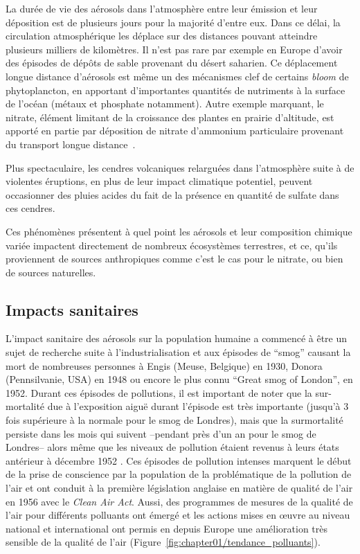 La durée de vie des aérosols dans l'atmosphère entre leur émission et leur déposition est
de plusieurs jours pour la majorité d'entre eux. Dans ce délai, la circulation atmosphérique les déplace sur des
distances pouvant atteindre plusieurs milliers de kilomètres. Il n'est pas rare par exemple en
Europe d'avoir des épisodes de dépôts de sable provenant du désert saharien. Ce
déplacement longue distance d'aérosols est même un des mécanismes clef de certains
\textit{bloom}
de phytoplancton, en apportant d'importantes quantités de nutriments à la surface de l'océan 
(métaux et phosphate notamment).
Autre exemple marquant, le nitrate, élément limitant de la croissance des
plantes en prairie d'altitude, est apporté en partie par
déposition de nitrate d'ammonium particulaire provenant du transport longue
distance~\autocite{bourgeoisFoliar2019}.

Plus spectaculaire, les cendres volcaniques relarguées dans l'atmosphère suite à de
violentes éruptions, en plus de leur impact climatique potentiel, peuvent occasionner des
pluies acides du fait de la présence en quantité de sulfate dans ces cendres.

Ces phénomènes présentent à quel point les aérosols et leur composition chimique variée
impactent directement de nombreux écosystèmes terrestres, et ce, qu'ils proviennent de sources
anthropiques comme c'est le cas pour le nitrate, ou bien de sources naturelles.

\subsection{Impacts sanitaires}%
\label{sub:impacts_sanitaires}

L'impact sanitaire des aérosols sur la population humaine a commencé à être
un sujet de recherche suite à l'industrialisation et aux épisodes de ``smog'' causant la
mort de nombreuses personnes à Engis (Meuse, Belgique) en 1930, Donora (Pennsilvanie, USA)
en 1948 ou encore le plus connu ``Great smog of London'', en 1952. Durant ces épisodes de
pollutions, il est important de noter que la sur-mortalité due à l'exposition aiguë
durant l'épisode est très importante (jusqu'à 3 fois supérieure à la normale
pour le smog de Londres), mais que la surmortalité persiste dans les mois qui suivent
--pendant près d'un an pour le smog de Londres-- alors même que les niveaux de pollution
étaient revenus à leurs états antérieur à décembre 1952 \autocite{bellReassessment2001}.  Ces
épisodes de pollution intenses marquent le début de la prise de conscience par la
population de la problématique de la pollution de l'air et ont conduit à la première
législation anglaise en matière de qualité de l'air en 1956 avec le \textit{Clean Air
Act}. Aussi, des programmes de mesures de la qualité de l'air pour différents polluants
ont émergé et les actions mises en œuvre au niveau national et international ont permis
en depuis Europe une amélioration très sensible de la qualité de l'air
(Figure~\ref{fig:chapter01/tendance_polluants}).

